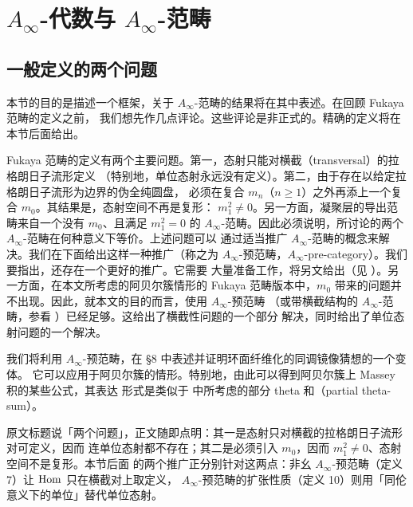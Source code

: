 \section{$A_\infty$-代数与 $A_\infty$-范畴}

\subsection{一般定义的两个问题}

本节的目的是描述一个框架，关于 $A_\infty$-范畴的结果将在其中表述。在回顾 Fukaya 范畴的定义之前，
我们想先作几点评论。这些评论是非正式的。精确的定义将在本节后面给出。

Fukaya 范畴的定义有两个主要问题。第一，态射只能对横截（transversal）的拉格朗日子流形定义
（特别地，单位态射永远没有定义）。第二，由于存在以给定拉格朗日子流形为边界的伪全纯圆盘，
必须在复合 $m_n$（$n\ge1$）之外再添上一个复合 $m_0$。其结果是，态射空间不再是复形：
$m_1^2\ne0$。另一方面，凝聚层的导出范畴来自一个没有 $m_0$、且满足 $m_1^2=0$ 的
$A_\infty$-范畴。因此必须说明，所讨论的两个 $A_\infty$-范畴在何种意义下等价。上述问题可以
通过适当推广 $A_\infty$-范畴的概念来解决。我们在下面给出这样一种推广（称之为
$A_\infty$-预范畴，$A_\infty$-pre-category）。我们要指出，还存在一个更好的推广。它需要
大量准备工作，将另文给出（见 \cite{KoS}）。另一方面，在本文所考虑的阿贝尔簇情形的 Fukaya
范畴版本中，$m_0$ 带来的问题并不出现。因此，就本文的目的而言，使用 $A_\infty$-预范畴
（或带横截结构的 $A_\infty$-范畴，参看 \cite{P1}）已经足够。这给出了横截性问题的一个部分
解决，同时给出了单位态射问题的一个解决。

我们将利用 $A_\infty$-预范畴，在 \S8 中表述并证明环面纤维化的同调镜像猜想的一个变体。
它可以应用于阿贝尔簇的情形。特别地，由此可以得到阿贝尔簇上 Massey 积的某些公式，其表达
形式是类似于 \cite{P1} 中所考虑的部分 theta 和（partial theta-sum）。

\begin{yizhu}
原文标题说「两个问题」，正文随即点明：其一是态射只对横截的拉格朗日子流形对可定义，因而
连单位态射都不存在；其二是必须引入 $m_0$，因而 $m_1^2\ne0$、态射空间不是复形。本节后面
的两个推广正分别针对这两点：非幺 $A_\infty$-预范畴（定义 7）让 $\operatorname{Hom}$ 只在横截对上取定义，
$A_\infty$-预范畴的扩张性质（定义 10）则用「同伦意义下的单位」替代单位态射。
\end{yizhu}

